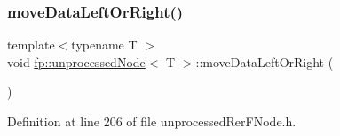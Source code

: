\subsubsection{\texorpdfstring{move\+Data\+Left\+Or\+Right()}{moveDataLeftOrRight()}\hspace{0.1cm}{\footnotesize\ttfamily [2/2]}}
{\footnotesize\ttfamily template$<$typename T $>$ \\
void \hyperlink{classfp_1_1unprocessedNode}{fp\+::unprocessed\+Node}$<$ T $>$\+::move\+Data\+Left\+Or\+Right (\begin{DoxyParamCaption}{ }\end{DoxyParamCaption})\hspace{0.3cm}{\ttfamily [inline]}}



Definition at line 206 of file unprocessed\+Rer\+F\+Node.\+h.


